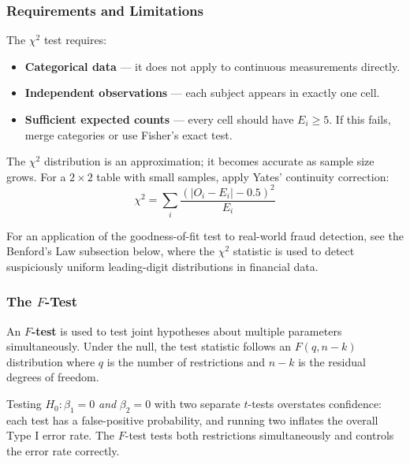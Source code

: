 \subsubsection*{Requirements and Limitations}

\begin{remark}
The $\chi^2$ test requires:
\begin{itemize}
    \item \textbf{Categorical data} — it does not apply to continuous measurements directly.
    \item \textbf{Independent observations} — each subject appears in exactly one cell.
    \item \textbf{Sufficient expected counts} — every cell should have $E_i \geq 5$. If this fails, merge categories or use Fisher's exact test.
\end{itemize}
The $\chi^2$ distribution is an approximation; it becomes accurate as sample size grows. For a $2 \times 2$ table with small samples, apply Yates' continuity correction:
\[
\chi^2 = \sum_{i} \frac{(|O_i - E_i| - 0.5)^2}{E_i}
\]
\end{remark}

\begin{remark}
For an application of the goodness-of-fit test to real-world fraud detection, see the Benford's Law subsection below, where the $\chi^2$ statistic is used to detect suspiciously uniform leading-digit distributions in financial data.
\end{remark}

\subsubsection*{The $F$-Test}

\begin{definition}[$F$-test]
An \textbf{$F$-test} is used to test joint hypotheses about multiple parameters simultaneously. Under the null, the test statistic follows an $F(q, n-k)$ distribution where $q$ is the number of restrictions and $n-k$ is the residual degrees of freedom.
\end{definition}

\begin{remark}
Testing $H_0\colon \beta_1 = 0$ \emph{and} $\beta_2 = 0$ with two separate $t$-tests overstates confidence: each test has a false-positive probability, and running two inflates the overall Type I error rate. The $F$-test tests both restrictions simultaneously and controls the error rate correctly.
\end{remark}

